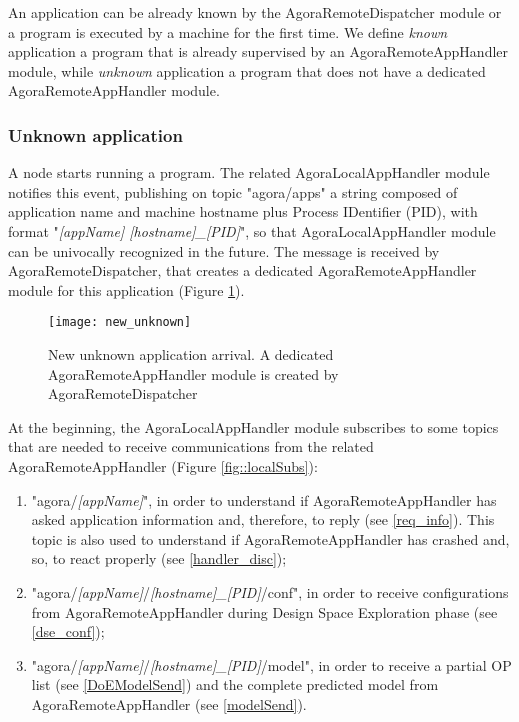 An application can be already known by the Agora\-Remote\-Dis\-patch\-er module or a program is executed by a machine for the first time. We define \textit{known} application a program that is already supervised by an AgoraRemoteAppHandler module, while \textit{unknown} application a program that does not have a dedicated AgoraRemoteAppHandler module.

\subsubsection{Unknown application}

A node starts running a program. The related AgoraLocalAppHandler module notifies this event, publishing on topic "agora\slash{}apps" a string composed of application name and machine hostname plus Process IDentifier (PID), with format "\textit{[appName] [hostname]\_[PID]}", so that AgoraLocalAppHandler module can be univocally recognized in the future. The message is received by Agora\-Remote\-Dispatcher, that creates a dedicated AgoraRemoteAppHandler module for this application (Figure \ref{fig::unk}).

\begin{figure}[hb]

    \centering
    \texttt{[image: new\_unknown]}
    \caption[New unknown application arrival]{New unknown application arrival. A dedicated AgoraRemoteAppHandler module is created by AgoraRemoteDispatcher}

    \label{fig::unk}
    
\end{figure}

At the beginning, the Agora\-Local\-App\-Handler module subscribes to some topics that are needed to receive communications from the related Agora\-Remote\-App\-Handler (Figure \ref{fig::localSubs}):

\begin{enumerate}

    \item "agora/\textit{[appName]}", in order to understand if AgoraRemoteAppHandler has asked application information and, therefore, to reply (see \ref{req_info}). This topic is also used to understand if Agora\-Remote\-App\-Handler has crashed and, so, to react properly (see \ref{handler_disc});
    
    \item "agora/\textit{[appName]}/\textit{[hostname]\_[PID]}/conf", in order to receive configurations from AgoraRemoteAppHandler during Design Space Exploration phase (see \ref{dse_conf});
    
    \item "agora/\textit{[appName]}/\textit{[hostname]\_[PID]}/model", in order to receive a partial OP list (see \ref{DoEModelSend}) and the complete predicted model from AgoraRemoteAppHandler (see \ref{modelSend}).

\end{enumerate}

